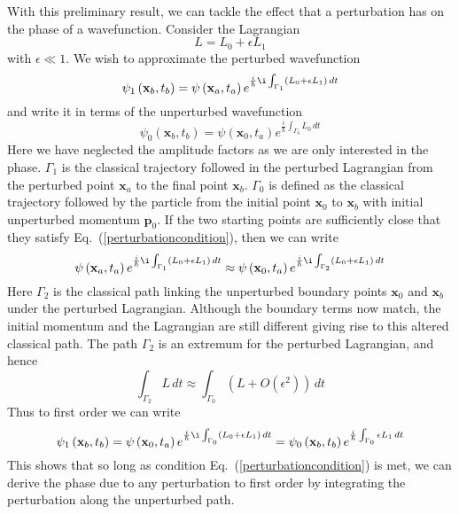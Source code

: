 With this preliminary result, we can tackle the effect that a perturbation has on the phase of a wavefunction. Consider the Lagrangian
\begin{equation}
L=L_0+\epsilon L_1
\end{equation}
with $\epsilon \ll 1$. We wish to approximate the perturbed wavefunction 
\begin{equation}
\psi_1\left(\mathbf{x}_b,t_b\right)=\psi\left(\mathbf{x}_a,t_a\right)e^{\frac{i}{\hbar}\i
\int_{\Gamma_1}\left(L_0+\epsilon L_1\right)\,dt}
\end{equation}
and write it in terms of the unperturbed wavefunction 
\begin{equation}
\psi_0\left(\mathbf{x}_b,t_b\right)=\psi\left(\mathbf{x}_0,t_a\right)e^{\frac{i}{\hbar}
\int_{\Gamma_0}L_0\,dt}
\end{equation}
Here we have neglected the amplitude factors as we are only interested in the phase. $\Gamma_1$ is the classical trajectory followed in the perturbed Lagrangian from the perturbed point $\mathbf{x}_a$ to the final point $\mathbf{x}_b$. $\Gamma_0$ is defined as the classical trajectory followed by the particle from the initial point $\mathbf{x}_0$ to $\mathbf{x}_b$ with initial unperturbed momentum $\mathbf{p}_0$.
If the two starting points are sufficiently close that they satisfy Eq.\ (\ref{perturbationcondition}), then we can write
\begin{equation}
\psi\left(\mathbf{x}_a,t_a\right)e^{\frac{i}{\hbar}\i
\int_{\Gamma_1}\left(L_0+\epsilon L_1\right)\,dt}\approx \psi\left(\mathbf{x}_0,t_a\right)e^{\frac{i}{\hbar}\i
\int_{\Gamma_2}\left(L_0+\epsilon L_1\right)\,dt}
\end{equation}
Here $\Gamma_2$ is the classical path linking the unperturbed boundary points $\mathbf{x}_0$ and $\mathbf{x}_b$ under the perturbed Lagrangian.  Although the boundary terms now match, the initial momentum and the Lagrangian are still different giving rise to this altered classical path.  The path $\Gamma_2$ is an extremum for the perturbed Lagrangian, and hence
\begin{equation}
\int_{\Gamma_2}L\,dt\approx \int_{\Gamma_0}\left(L+O(\epsilon^2)\right)\,dt
\end{equation}
Thus to first order we can write
\begin{equation}
\psi_1\left(\mathbf{x}_b,t_b\right)=\psi\left(\mathbf{x}_0,t_a\right)e^{\frac{i}{\hbar}\i
\int_{\Gamma_0}\left(L_0+\epsilon L_1\right)\,dt}=\psi_0\left(\mathbf{x}_b,t_b\right)e^{\frac{i}{\hbar}\int_{\Gamma_0}\epsilon L_1\,dt}
\end{equation}
This shows that so long as condition Eq.\ (\ref{perturbationcondition}) is met, we can derive the phase due to any perturbation to first order by integrating the perturbation along the unperturbed path.




